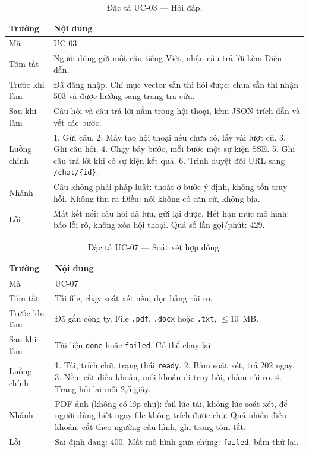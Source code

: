 \begin{table}[htp]
\centering
\caption{Đặc tả UC-03 --- Hỏi đáp.}
\label{tab:uc03}
\begin{tabular}{p{3.2cm}p{10.8cm}}
\toprule
\textbf{Trường} & \textbf{Nội dung} \\
\midrule
Mã & UC-03 \\
Tóm tắt & Người dùng gửi một câu tiếng Việt, nhận câu trả lời kèm Điều dẫn. \\
Trước khi làm & Đã đăng nhập. Chỉ mục vector sẵn thì hỏi được; chưa sẵn thì
nhận 503 và được hướng sang trang tra cứu. \\
Sau khi làm & Câu hỏi và câu trả lời nằm trong hội thoại, kèm JSON trích dẫn
và vết các bước. \\
Luồng chính & 1. Gửi câu. 2. Máy tạo hội thoại nếu chưa có, lấy vài lượt cũ.
3. Ghi câu hỏi. 4. Chạy bảy bước, mỗi bước một sự kiện SSE. 5. Ghi câu trả
lời khi có sự kiện kết quả. 6. Trình duyệt đổi URL sang \texttt{/chat/\{id\}}. \\
Nhánh & Câu không phải pháp luật: thoát ở bước ý định, không tốn truy hồi.
Không tìm ra Điều: nói không có căn cứ, không bịa. \\
Lỗi & Mất kết nối: câu hỏi đã lưu, gửi lại được. Hết hạn mức mô hình: báo lỗi
rõ, không xóa hội thoại. Quá số lần gọi/phút: 429. \\
\bottomrule
\end{tabular}
\end{table}

\begin{table}[htp]
\centering
\caption{Đặc tả UC-07 --- Soát xét hợp đồng.}
\label{tab:uc07}
\begin{tabular}{p{3.2cm}p{10.8cm}}
\toprule
\textbf{Trường} & \textbf{Nội dung} \\
\midrule
Mã & UC-07 \\
Tóm tắt & Tải file, chạy soát xét nền, đọc bảng rủi ro. \\
Trước khi làm & Đã gắn công ty. File \texttt{.pdf}, \texttt{.docx} hoặc
\texttt{.txt}, $\le 10$~MB. \\
Sau khi làm & Tài liệu \texttt{done} hoặc \texttt{failed}. Có thể chạy lại. \\
Luồng chính & 1. Tải, trích chữ, trạng thái \texttt{ready}. 2. Bấm soát xét,
trả 202 ngay. 3. Nền: cắt điều khoản, mỗi khoản đi truy hồi, chấm rủi ro. 4.
Trang hỏi lại mỗi 2,5 giây. \\
Nhánh & PDF ảnh (không có lớp chữ): fail lúc tải, không lúc soát xét, để người
dùng biết ngay file không trích được chữ. Quá nhiều điều khoản: cắt theo ngưỡng
cấu hình, ghi trong tóm tắt. \\
Lỗi & Sai định dạng: 400. Mất mô hình giữa chừng: \texttt{failed}, bấm thử
lại. \\
\bottomrule
\end{tabular}
\end{table}

